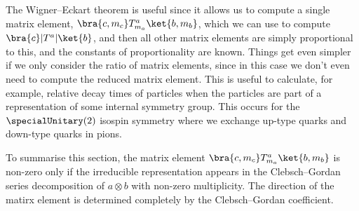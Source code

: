 \documentclass[fleqn]{NotesClass}
\newcommand*{\directproduct}{\otimes}
\begin{document}
    The Wigner--Eckart theorem is useful since it allows us to compute a single matrix element, \(\bra{c, m_c}T_{m_a}^a\ket{b, m_b}\), which we can use to compute \(\bra{c}|T^a|\ket{b}\), and then all other matrix elements are simply proportional to this, and the constants of proportionality are known.
    Things get even simpler if we only consider the ratio of matrix elements, since in this case we don't even need to compute the reduced matrix element.
    This is useful to calculate, for example, relative decay times of particles when the particles are part of a representation of some internal symmetry group.
    This occurs for the \(\specialUnitary(2)\) isospin symmetry where we exchange up-type quarks and down-type quarks in pions.
    
    To summarise this section, the matrix element \(\bra{c, m_c}T_{m_a}^{a}\ket{b, m_b}\) is non-zero only if the irreducible representation appears in the Clebsch--Gordan series decomposition of \(a \directproduct b\) with non-zero multiplicity.
    The direction of the matirx element is determined completely by the Clebsch--Gordan coefficient.
    
    
    \appendixpage
    \begin{appendices}
        
        
        
        
    \end{appendices}
    
    \backmatter
    \renewcommand{\glossaryname}{Acronyms}
    \printglossary[acronym]
    \printindex
\end{document}
